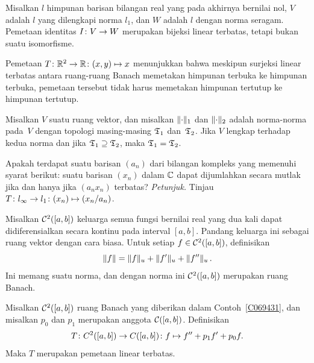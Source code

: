 \begin{exam} Misalkan $l$ himpunan barisan bilangan real yang pada akhirnya bernilai nol,
$V$ adalah $l$ yang dilengkapi norma $l_1$, dan $W$ adalah $l$ dengan norma seragam.  Pemetaan
identitas $I\colon V \rightarrow W$ merupakan bijeksi linear terbatas, tetapi bukan suatu isomorfisme.
\end{exam}

\begin{exam} Pemetaan $T\colon \mathbb{R}^2 \rightarrow \mathbb{R}\colon (x,y) \mapsto x$ menunjukkan bahwa meskipun
surjeksi linear terbatas antara ruang-ruang Banach memetakan himpunan terbuka ke himpunan terbuka, pemetaan tersebut tidak harus
memetakan himpunan tertutup ke himpunan tertutup.
\end{exam}

\begin{prop} Misalkan $V$ suatu ruang vektor, dan misalkan $\lVert\cdot\rVert_1$ dan
$\lVert\cdot\rVert_2$ adalah norma-norma pada~$V$ dengan topologi masing-masing $\mathfrak{T}_1$
dan~$\mathfrak{T}_2$.  Jika $V$ lengkap terhadap kedua norma dan jika $\mathfrak{T}_1
\supseteq \mathfrak{T}_2$, maka $\mathfrak{T}_1 = \mathfrak{T}_2$.
\end{prop}

\begin{exer} Apakah terdapat suatu barisan $(a_n)$ dari bilangan kompleks yang memenuhi
syarat berikut: suatu barisan $(x_n)$ dalam $\mathbb{C}$ dapat dijumlahkan secara mutlak jika dan hanya jika
$(a_nx_n)$ terbatas? \emph{Petunjuk.} Tinjau $ T\colon l_\infty \rightarrow l_1\colon (x_n)
\mapsto (x_n/a_n)$.
\end{exer}

\begin{exam}\label{C069431} Misalkan $\mathcal{C}^2([a,b])$ keluarga semua fungsi bernilai real yang dua kali
dapat didiferensialkan secara kontinu pada interval $[a,b]$. Pandang keluarga ini sebagai ruang vektor
dengan cara biasa. Untuk setiap $f \in \mathcal{C}^2([a,b])$, definisikan
    \[ \lVert f\rVert = \lVert f\rVert_u + \lVert f'\rVert_u + \lVert f''\rVert_u\,. \]
Ini memang suatu norma, dan dengan norma ini $\mathcal{C}^2([a,b])$ merupakan ruang Banach.
\end{exam}

\begin{exam}\label{C069432} Misalkan $\mathcal{C}^2([a,b])$ ruang Banach yang diberikan dalam
Contoh~\ref{C069431}, dan misalkan $p_0$ dan $p_1$ merupakan anggota $\mathcal{C}([a,b])$.   Definisikan
  \[T\colon C^2([a,b]) \rightarrow C([a,b])\colon
                      f \mapsto f'' + p_1f' + p_0f.\]
Maka $T$ merupakan pemetaan linear terbatas.
\end{exam}

